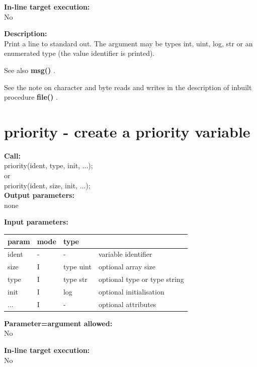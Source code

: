         {\bf In-line target execution:} \\
        No
        
        {\bf Description:} \\
        Print a line to standard out. The argument may be types int, uint, log,
        str or an enumerated type (the value identifier is printed).
        
        See also {\bf msg()} .
        
        See the note on character and byte reads and writes in the description
        of inbuilt procedure {\bf file()} .


    \section{priority - create a priority variable}\label{sec:ippriority}
        
        {\bf Call:} \\
        priority(ident, type, init, ...); \\
        or  \\
        priority(ident, size, init, ...); \\
        
        
        {\bf Output parameters:} \\
        none
        
        {\bf Input parameters:} \\
        \begin{tabular}{| l | l | l | l |}
        \hline
        param  & mode & type & \\
        \hline \hline
        ident & - &  -        & variable identifier          \\ \hline
        size  & I & type uint & optional array size          \\
        type  & I & type str  & optional type or type string \\ \hline
        init  & I & log       & optional initialisation      \\ \hline
        ...   & I &  -        & optional attributes          \\ \hline
        \end{tabular}
        
        {\bf Parameter=argument allowed:} \\
        No
        
        {\bf In-line target execution:} \\
        No
        
